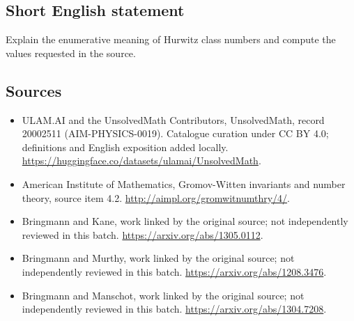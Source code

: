 \documentclass[11pt]{article}
\begin{document}
\subsection{Short English statement}
Explain the enumerative meaning of Hurwitz class numbers and compute the values requested in the source.
\subsection{Sources}
\begin{itemize}
\item[\hypertarget{source:20002511:1}{S1}] ULAM.AI and the UnsolvedMath Contributors, UnsolvedMath, record 20002511 (AIM-PHYSICS-0019). Catalogue curation under CC BY 4.0; definitions and English exposition added locally.
\url{https://huggingface.co/datasets/ulamai/UnsolvedMath}.
\item[\hypertarget{source:20002511:2}{S2}] American Institute of Mathematics, Gromov-Witten invariants and number theory, source item 4.2.
\url{http://aimpl.org/gromwitnumthry/4/}.
\item[\hypertarget{source:20002511:3}{S3}] Bringmann and Kane, work linked by the original source; not independently reviewed in this batch.
\url{https://arxiv.org/abs/1305.0112}.
\item[\hypertarget{source:20002511:4}{S4}] Bringmann and Murthy, work linked by the original source; not independently reviewed in this batch.
\url{https://arxiv.org/abs/1208.3476}.
\item[\hypertarget{source:20002511:5}{S5}] Bringmann and Manschot, work linked by the original source; not independently reviewed in this batch.
\url{https://arxiv.org/abs/1304.7208}.
\end{itemize}
\label{end:20002511}
\end{document}
